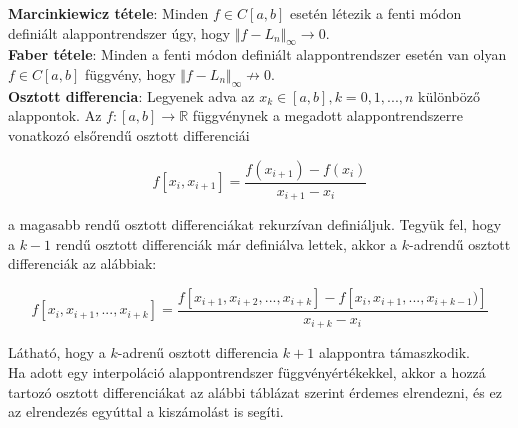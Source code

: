 \documentclass[margin=0px]{article}
\begin{document}
\noindent \textbf{Marcinkiewicz tétele}: Minden $f \in C[a,b]$ esetén létezik a fenti módon definiált alappontrendszer
úgy, hogy $\Vert f - L_{n}\Vert_{\infty} \to 0$.\\

\noindent \textbf{Faber tétele}: Minden a fenti módon definiált alappontrendszer esetén van olyan $f \in C[a,b]$ függvény,
hogy $\Vert f - L_{n}\Vert_{\infty} \not \to 0$.\\

\noindent \textbf{Osztott differencia}: Legyenek adva az $x_{k} \in [a,b], k=0,1,...,n$ különböző alappontok.
Az $f:[a,b] \to \mathbb{R}$ függvénynek a megadott alappontrendszerre vonatkozó elsőrendű osztott differenciái

\begin{displaymath}
    f[x_{i},x_{i+1}] = \frac{f(x_{i+1})-f(x_{i})}{x_{i+1} - x_{i}}
\end{displaymath}

\noindent a magasabb rendű osztott differenciákat rekurzívan definiáljuk. Tegyük fel, hogy a $k-1$ rendű osztott differenciák
már definiálva lettek, akkor a $k$-adrendű osztott differenciák az alábbiak:

\begin{displaymath}
    f[x_{i},x_{i+1},...,x_{i+k}] = \frac{f[x_{i+1},x_{i+2}, ..., x_{i+k}]-f[x_{i},x_{i+1}, ..., x_{i+k-1})]}{x_{i+k} - x_{i}}
\end{displaymath}

\noindent Látható, hogy a $k$-adrenű osztott differencia $k+1$ alappontra támaszkodik.\\

Ha adott egy interpoláció alappontrendszer függvényértékekkel, akkor a hozzá tartozó osztott differenciákat az
alábbi táblázat szerint érdemes elrendezni, és ez az elrendezés egyúttal a kiszámolást is segíti.
\end{document}
